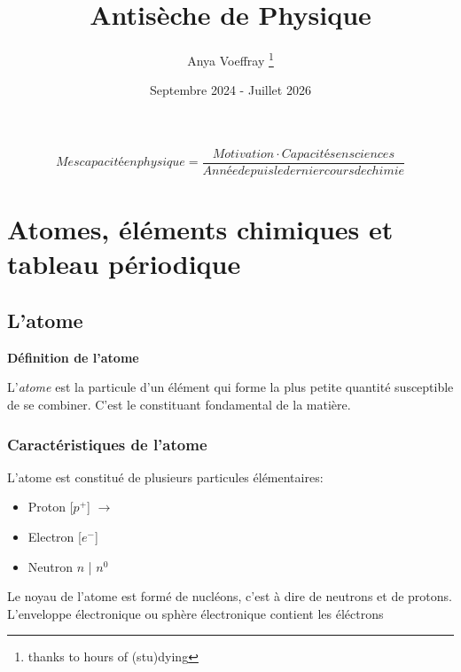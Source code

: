 \documentclass{article}
\title{Antisèche de Physique}
\author{Anya Voeffray \thanks{thanks to hours of (stu)dying}}
\date{Septembre 2024 - Juillet 2026}
\begin{document}
\begin{titlepage}
\maketitle

\begin{equation}
  Mes capacité en physique = \frac{Motivation \cdot Capacités en sciences}{Année depuis le dernier cours de chimie}
\end{equation}

\end{titlepage}


\section{Atomes, éléments chimiques et tableau périodique}

\subsection{L'atome}

\textbf{Définition de l'atome}

L'\textit{atome} est la particule d'un élément qui forme la plus petite quantité susceptible de se combiner.
C'est le constituant fondamental de la matière. 

\subsubsection{Caractéristiques de l'atome}

L'atome est constitué de plusieurs particules élémentaires:

\begin{itemize}
  \item Proton [$p^+$] $\rightarrow$ 
  \item Electron [$e^-$] \rightarrow {}
  \item Neutron $n$ | $n^0$ \rightarrow {}
\end{itemize}

Le noyau de l'atome est formé de nucléons, c'est à dire de neutrons et de protons.
L'enveloppe électronique ou sphère électronique contient les éléctrons
\end{document}
